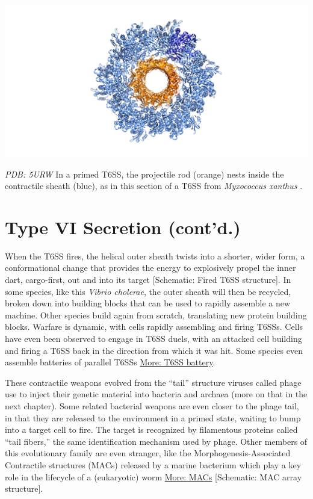 \documentclass[]{tufte-book}
\begin{document}
\includegraphics{img/schematics/9_6_1}

\emph{PDB: 5URW}
In a primed T6SS, the projectile rod (orange) nests inside the contractile sheath (blue), as in this section of a T6SS from \emph{Myxococcus xanthus} \citep{chang2017}.

\hypertarget{type-vi-secretion-contd.}{%
\section{Type VI Secretion (cont'd.)}\label{type-vi-secretion-contd.}}

When the T6SS fires, the helical outer sheath twists into a shorter, wider form, a conformational change that provides the energy to explosively propel the inner dart, cargo-first, out and into its target {[}Schematic: Fired T6SS structure{]}. In some species, like this \emph{Vibrio cholerae}, the outer sheath will then be recycled, broken down into building blocks that can be used to rapidly assemble a new machine. Other species build again from scratch, translating new protein building blocks. Warfare is dynamic, with cells rapidly assembling and firing T6SSs. Cells have even been observed to engage in T6SS duels, with an attacked cell building and firing a T6SS back in the direction from which it was hit. Some species even assemble batteries of parallel T6SSs \protect\hyperlink{T6SS_battery}{More: T6SS battery}.

These contractile weapons evolved from the ``tail'' structure viruses called phage use to inject their genetic material into bacteria and archaea (more on that in the next chapter). Some related bacterial weapons are even closer to the phage tail, in that they are released to the environment in a primed state, waiting to bump into a target cell to fire. The target is recognized by filamentous proteins called ``tail fibers,'' the same identification mechanism used by phage. Other members of this evolutionary family are even stranger, like the Morphogenesis-Associated Contractile structures (MACs) released by a marine bacterium which play a key role in the lifecycle of a (eukaryotic) worm \protect\hyperlink{MACs}{More: MACs} {[}Schematic: MAC array structure{]}.
\end{document}
